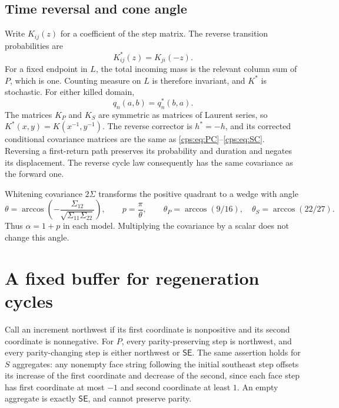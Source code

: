 \documentclass[11pt,letterpaper]{article}
\numberwithin{equation}{section}
\theoremstyle{remark}\newtheorem{remark}[theorem]{Remark}
\newcommand{\SE}{\mathsf{SE}}
\begin{document}
\subsection{Time reversal and cone angle}
Write $K_{ij}(z)$ for a coefficient of the step matrix. The reverse transition probabilities are
\begin{equation}\label{cps:eq:reverse}
 K^*_{ij}(z)=K_{ji}(-z).
\end{equation}
For a fixed endpoint in $L$, the total incoming mass is the relevant column sum of $P$, which is one. Counting measure on $L$ is therefore invariant, and $K^*$ is stochastic. For either killed domain,
\begin{equation}\label{cps:eq:killedreverse}
 q_n(a,b)=q_n^*(b,a).
\end{equation}
The matrices $K_P$ and $K_S$ are symmetric as matrices of Laurent series, so $K^*(x,y)=K(x^{-1},y^{-1})$. The reverse corrector is $h^*=-h$, and its corrected conditional covariance matrices are the same as \eqref{cps:eq:PC}--\eqref{cps:eq:SC}. Reversing a first-return path preserves its probability and duration and negates its displacement. The reverse cycle law consequently has the same covariance as the forward one.

Whitening covariance $2\Sigma$ transforms the positive quadrant to a wedge with angle
\begin{equation}\label{cps:eq:angles}
 \theta=\arccos\!\left(-\frac{\Sigma_{12}}{\sqrt{\Sigma_{11}\Sigma_{22}}}\right),
 \qquad p=\frac{\pi}{\theta},
 \qquad
 \theta_P=\arccos(9/16),\quad \theta_S=\arccos(22/27).
\end{equation}
Thus $\alpha=1+p$ in each model. Multiplying the covariance by a scalar does not change this angle.

\section{A fixed buffer for regeneration cycles}\label{cps:sec:buffer}
Call an increment northwest if its first coordinate is nonpositive and its second coordinate is nonnegative. For $P$, every parity-preserving step is northwest, and every parity-changing step is either northwest or $\SE$. The same assertion holds for $S$ aggregates: any nonempty face string following the initial southeast step offsets its increase of the first coordinate and decrease of the second, since each face step has first coordinate at most $-1$ and second coordinate at least $1$. An empty aggregate is exactly $\SE$, and cannot preserve parity.
\end{document}
